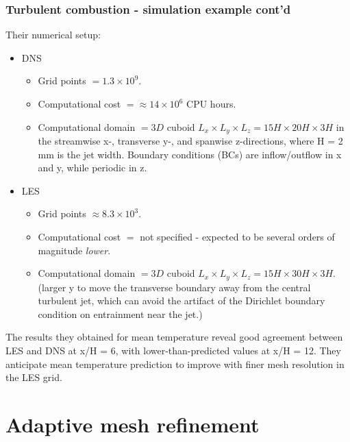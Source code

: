 \documentclass{beamer}
\begin{document}
\begin{frame}%
\frametitle{Turbulent combustion - simulation example cont'd}
\scriptsize
Their numerical setup:
\begin{itemize}
\item DNS 
\begin{itemize}
\tiny
\item Grid points $ = 1.3 \times 10^9$.  
\item Computational cost $ = \approx 14 \times 10^6$ CPU hours.
\item Computational domain $ = 3D $ cuboid  $L_x \times L_y \times L_z = 15H \times 20H \times 3H$ in the streamwise x-, transverse y-, and spanwise z-directions, where H = 2 mm is the jet width. Boundary conditions (BCs) are inflow/outflow in x and y, while periodic in z.
\end{itemize}
\item LES
\begin{itemize}
\tiny
\item Grid points $ \approx 8.3 \times 10^3$.  
\item Computational cost $ = $ not specified - expected to be several orders of magnitude \textit{lower}.
\item Computational domain $ = 3D $ cuboid $  L_x \times L_y \times L_z = 15H \times 30H \times 3H$. (larger y to move the transverse boundary away from the central turbulent jet, which can avoid the artifact of the Dirichlet boundary condition on entrainment near the jet.)
\end{itemize}
\end{itemize}
The results they obtained for mean temperature reveal good agreement between LES and DNS at x/H = 6, with lower-than-predicted values at x/H = 12. They anticipate mean temperature prediction to improve with finer mesh resolution in the LES grid.

\end{frame}


\section[AMR]{Adaptive mesh refinement}
\end{document}
